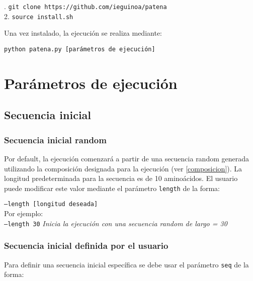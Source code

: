 . \hspace{0.5cm} \texttt{git clone https://github.com/ieguinoa/patena}\\
2. \hspace{0.5cm} \texttt{source install.sh}


Una vez instalado, la ejecución se realiza mediante: 

\texttt{python patena.py [parámetros de ejecución]}


\section{Parámetros de ejecución}\label{parametros}


\subsection{Secuencia inicial} \label{secuenciaInicial}
\subsubsection{Secuencia inicial random}\label{secuenciaInicialRandom}
Por default, la ejecución comenzará a partir de una secuencia random generada utilizando la composición designada para la ejecución (ver \ref{composicion}).
La longitud predeterminada para la secuencia es de 10 aminoácidos. 
El usuario puede modificar este valor mediante el parámetro \texttt{length} de la forma: 

\indent \texttt{--length [longitud deseada]}
\\Por ejemplo: \\
\indent \texttt{--length 30} \hspace{0.5cm} \textit{Inicia la ejecución con una secuencia random de largo = 30}



\subsubsection{Secuencia inicial definida por el usuario}\label{secuenciaInicialDefinida}

Para definir una secuencia inicial específica se debe usar el parámetro \texttt{seq} de la forma:

